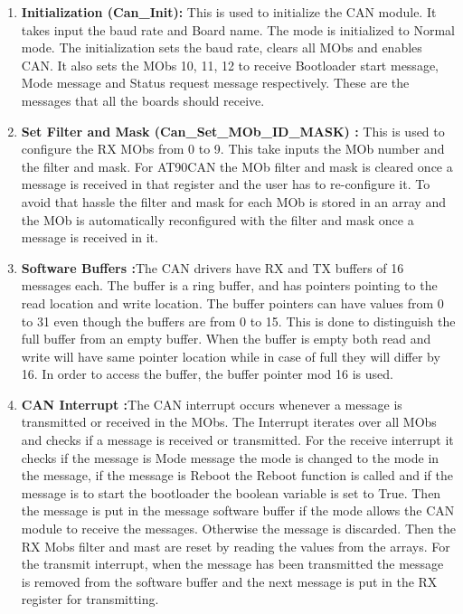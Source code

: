 \begin{enumerate}
\item \textbf{Initialization (Can\_Init):} This is used to initialize the CAN module. It takes input the baud rate and Board name. The mode is initialized to Normal mode. The initialization sets the baud rate, clears all MObs and enables CAN. It also sets the MObs 10, 11, 12 to receive Bootloader start message, Mode message and Status request message respectively. These are the messages that all the boards should receive.
\item \textbf{Set Filter and Mask (Can\_Set\_MOb\_ID\_MASK) :} This is used to configure the RX MObs from 0 to 9. This take inputs the MOb number and the filter and mask. For AT90CAN the MOb filter and mask is cleared once a message is received in that register and the user has to re-configure it. To avoid that hassle the filter and mask for each MOb is stored in an array and the MOb is automatically reconfigured with the filter and mask once a message is received in it.
\item \textbf{Software Buffers :}The CAN drivers have RX and TX buffers of 16 messages each. The buffer is a ring buffer, and has pointers pointing to the read location and write location. The buffer pointers can have values from 0 to 31 even though the buffers are from 0 to 15. This is done to distinguish the full buffer from an empty buffer. When the buffer is empty both read and write will have same pointer location while in case of full they will differ by 16. In order to access the buffer, the buffer pointer mod 16 is used. 
\item \textbf{CAN Interrupt :}The CAN interrupt occurs whenever a message is transmitted or received in the MObs. The Interrupt iterates over all MObs and checks if a message is received or transmitted. \newline
For the receive interrupt it checks if the message is Mode message the mode is changed to the mode in the message, if the message is Reboot the Reboot function is called and if the message is to start the bootloader the boolean variable is set to True. Then the message is put in the message software buffer if the mode allows the CAN module to receive the messages. Otherwise the message is discarded. Then the RX Mobs filter and mast are reset by reading the values from the arrays.\newline
For the transmit interrupt, when the message has been transmitted the message is removed from the software buffer and the next message is put in the RX register for transmitting.

\end{enumerate}
